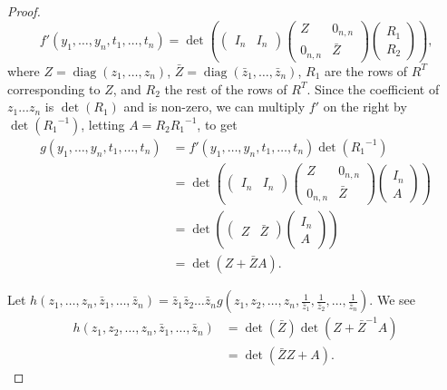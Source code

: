 \documentclass[11pt,letterpaper]{article}
\DeclareMathOperator*{\diag}{diag}
\newtheorem{observation}{Observation}[section]
\begin{document}
{{{\begin{proof}
\[f'(y_1, \dots, y_n, t_1, \dots, t_n) = \det\left(\begin{pmatrix}I_n & I_n\end{pmatrix}\begin{pmatrix}Z & 0_{n,n} \\ 0_{n,n} & \bar{Z}\end{pmatrix} \begin{pmatrix}R_1 \\ R_2\end{pmatrix}\right)\text{,}\]
where $Z = \diag(z_1, \dots, z_n)$, $\bar{Z} = \diag(\bar{z}_1, \dots, \bar{z}_n)$, $R_1$ are the rows of $R^T$ corresponding to $Z$, and $R_2$ the rest of the rows of $R^T$. Since the coefficient of $z_1\dots z_n$ is $\det(R_1)$ and is non-zero, we can multiply $f'$ on the right by $\det({R_1}^{-1})$, letting $A = R_2{R_1}^{-1}$, to get
\begin{align*}
    g(y_1, \dots, y_n, t_1, \dots, t_n) &= f'(y_1, \dots, y_n, t_1, \dots, t_n) \det({R_1}^{-1}) \\
        &= \det\left(\begin{pmatrix}I_n & I_n\end{pmatrix}\begin{pmatrix}Z & 0_{n,n} \\ 0_{n,n} & \bar{Z}\end{pmatrix} \begin{pmatrix}I_n \\ A\end{pmatrix}\right) \\
        &= \det\left(\begin{pmatrix}Z & \bar{Z}\end{pmatrix}\begin{pmatrix}I_n \\ A\end{pmatrix}\right) \\
        &= \det\left(Z + \bar{Z}A\right)\text{.}
\end{align*}

Let $h(z_1, \dots, z_n, \bar{z}_1, \dots, \bar{z}_n) = \bar{z}_1\bar{z}_2\dots\bar{z}_{n}g(z_1, z_2, \dots, z_n, \frac{1}{\bar{z}_1}, \frac{1}{\bar{z}_2}, \dots, \frac{1}{\bar{z}_n})$. We see
\begin{align*}
    h(z_1, z_2, \dots, z_n, \bar{z}_1, \dots, \bar{z}_{n}) &= \det(\bar{Z})\det(Z+\bar{Z}^{-1}A) \\
        &= \det(\bar{Z}Z + A)\text{.}
\end{align*}



\end{proof}}}}
\end{document}

